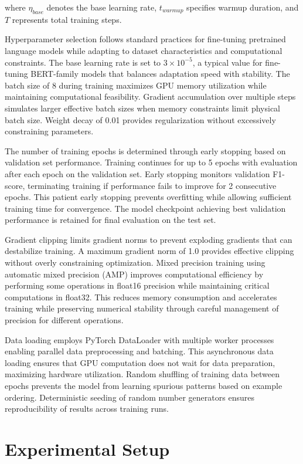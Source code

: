 \documentclass[12pt,a4paper]{report}
\begin{document}
where $\eta_{base}$ denotes the base learning rate, $t_{warmup}$ specifies warmup duration, and $T$ represents total training steps.

Hyperparameter selection follows standard practices for fine-tuning pretrained language models while adapting to dataset characteristics and computational constraints. The base learning rate is set to $3 \times 10^{-5}$, a typical value for fine-tuning BERT-family models that balances adaptation speed with stability. The batch size of 8 during training maximizes GPU memory utilization while maintaining computational feasibility. Gradient accumulation over multiple steps simulates larger effective batch sizes when memory constraints limit physical batch size. Weight decay of 0.01 provides regularization without excessively constraining parameters.

The number of training epochs is determined through early stopping based on validation set performance. Training continues for up to 5 epochs with evaluation after each epoch on the validation set. Early stopping monitors validation F1-score, terminating training if performance fails to improve for 2 consecutive epochs. This patient early stopping prevents overfitting while allowing sufficient training time for convergence. The model checkpoint achieving best validation performance is retained for final evaluation on the test set.

Gradient clipping limits gradient norms to prevent exploding gradients that can destabilize training. A maximum gradient norm of 1.0 provides effective clipping without overly constraining optimization. Mixed precision training using automatic mixed precision (AMP) improves computational efficiency by performing some operations in float16 precision while maintaining critical computations in float32. This reduces memory consumption and accelerates training while preserving numerical stability through careful management of precision for different operations.

Data loading employs PyTorch DataLoader with multiple worker processes enabling parallel data preprocessing and batching. This asynchronous data loading ensures that GPU computation does not wait for data preparation, maximizing hardware utilization. Random shuffling of training data between epochs prevents the model from learning spurious patterns based on example ordering. Deterministic seeding of random number generators ensures reproducibility of results across training runs.

\section{Experimental Setup}
\end{document}
